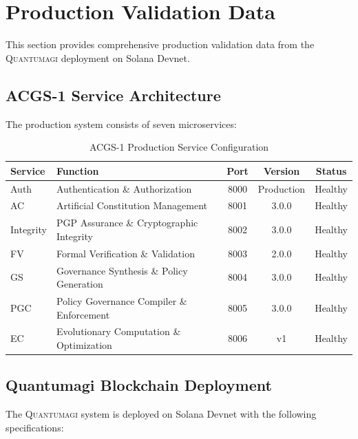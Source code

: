 \documentclass[10pt,twocolumn]{article}
\newcommand{\quantumagi}{\textsc{Quantumagi}}
\theoremstyle{definition}
\begin{document}
\section{Production Validation Data}
\label{sec:appendix_production}
This section provides comprehensive production validation data from the \quantumagi{} deployment on Solana Devnet.

\subsection{ACGS-1 Service Architecture}
The production system consists of seven microservices:

\begin{table}[H]
\centering
\caption{ACGS-1 Production Service Configuration}
\label{tab:acgs_services}
\begin{tabular}{@{}llccc@{}}
\toprule
\textbf{Service} & \textbf{Function} & \textbf{Port} & \textbf{Version} & \textbf{Status} \\
\midrule
Auth & Authentication \& Authorization & 8000 & Production & Healthy \\
AC & Artificial Constitution Management & 8001 & 3.0.0 & Healthy \\
Integrity & PGP Assurance \& Cryptographic Integrity & 8002 & 3.0.0 & Healthy \\
FV & Formal Verification \& Validation & 8003 & 2.0.0 & Healthy \\
GS & Governance Synthesis \& Policy Generation & 8004 & 3.0.0 & Healthy \\
PGC & Policy Governance Compiler \& Enforcement & 8005 & 3.0.0 & Healthy \\
EC & Evolutionary Computation \& Optimization & 8006 & v1 & Healthy \\
\bottomrule
\end{tabular}
\end{table}

\subsection{Quantumagi Blockchain Deployment}
The \quantumagi{} system is deployed on Solana Devnet with the following specifications:
\end{document}
